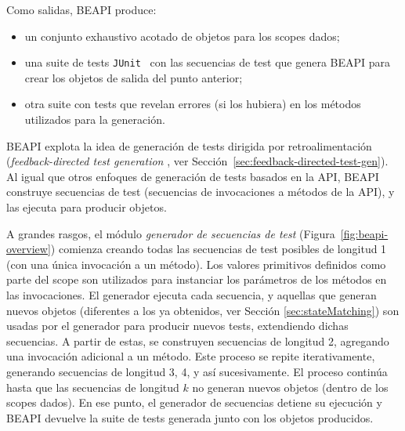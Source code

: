 Como salidas, \textsf{BEAPI} produce:
\begin{itemize}
    \item un conjunto exhaustivo acotado de objetos para los scopes dados;
    \item una suite de tests \texttt{JUnit}~\cite{junit} con las secuencias de test 
        que genera \textsf{BEAPI} para crear los objetos de salida del punto anterior;
    \item otra suite con tests que revelan errores (si los hubiera) en los métodos utilizados 
        para la generación.
\end{itemize}

\textsf{BEAPI} explota la idea de generación de tests dirigida por retroalimentación 
(\emph{feedback-directed test generation} \cite{} , ver Sección~\ref{sec:feedback-directed-test-gen}). 
Al igual que otros enfoques de generación de tests basados en la API, 
\textsf{BEAPI} construye secuencias de test \cite{}  (secuencias de invocaciones a
métodos de la API), y las ejecuta para producir objetos.


A grandes rasgos, el módulo \emph{generador de secuencias de test} (Figura~\ref{fig:beapi-overview}) 
comienza creando todas las secuencias de test posibles de longitud 1 (con una
única invocación a un método). Los valores primitivos definidos como parte del
scope son utilizados para instanciar los parámetros de los métodos en las
invocaciones.
El generador ejecuta cada secuencia, y aquellas que generan nuevos objetos (diferentes 
a los ya obtenidos, ver Sección \ref{sec:stateMatching}) son usadas por
el generador para producir nuevos tests, extendiendo dichas secuencias. A partir
de estas, se construyen secuencias de longitud 2, agregando una invocación
adicional a un método. 
Este proceso se repite iterativamente, generando secuencias de longitud 3, 4, y así sucesivamente.
El proceso continúa hasta que las secuencias de longitud $k$ no generan nuevos 
objetos (dentro de los scopes dados).
En ese punto, el generador de secuencias detiene su ejecución y BEAPI devuelve
la suite de tests generada junto con los objetos producidos.

